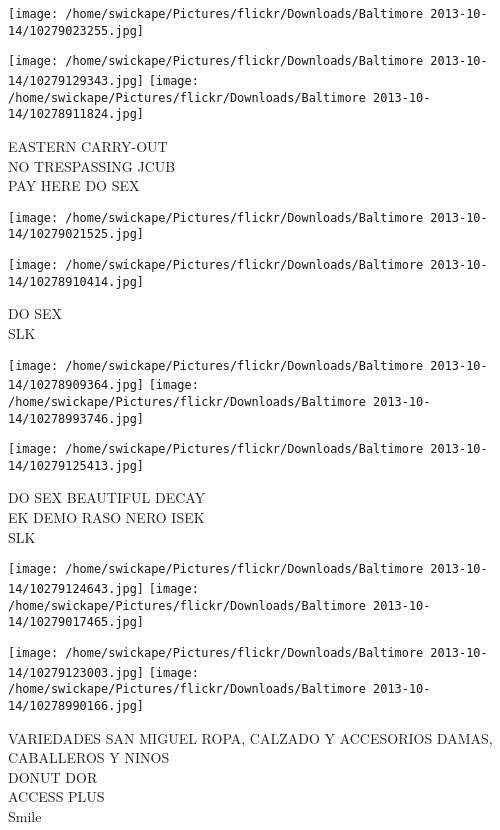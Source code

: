\documentclass[10pt,letterpaper]{article}
\begin{document}
\texttt{[image: /home/swickape/Pictures/flickr/Downloads/Baltimore 2013-10-14/10279023255.jpg]}

\vspace{0.25in}
\texttt{[image: /home/swickape/Pictures/flickr/Downloads/Baltimore 2013-10-14/10279129343.jpg]}
\texttt{[image: /home/swickape/Pictures/flickr/Downloads/Baltimore 2013-10-14/10278911824.jpg]}

EASTERN CARRY{-}OUT\\
NO TRESPASSING JCUB\\
PAY HERE DO SEX
\pagebreak

\texttt{[image: /home/swickape/Pictures/flickr/Downloads/Baltimore 2013-10-14/10279021525.jpg]}

\vspace{0.25in}
\texttt{[image: /home/swickape/Pictures/flickr/Downloads/Baltimore 2013-10-14/10278910414.jpg]}

DO SEX\\
SLK
\pagebreak

\texttt{[image: /home/swickape/Pictures/flickr/Downloads/Baltimore 2013-10-14/10278909364.jpg]}
\texttt{[image: /home/swickape/Pictures/flickr/Downloads/Baltimore 2013-10-14/10278993746.jpg]}

\vspace{0.25in}
\texttt{[image: /home/swickape/Pictures/flickr/Downloads/Baltimore 2013-10-14/10279125413.jpg]}

DO SEX BEAUTIFUL DECAY\\
EK DEMO RASO NERO ISEK\\
SLK
\pagebreak

\texttt{[image: /home/swickape/Pictures/flickr/Downloads/Baltimore 2013-10-14/10279124643.jpg]}
\texttt{[image: /home/swickape/Pictures/flickr/Downloads/Baltimore 2013-10-14/10279017465.jpg]}

\texttt{[image: /home/swickape/Pictures/flickr/Downloads/Baltimore 2013-10-14/10279123003.jpg]}
\texttt{[image: /home/swickape/Pictures/flickr/Downloads/Baltimore 2013-10-14/10278990166.jpg]}

VARIEDADES SAN MIGUEL ROPA, CALZADO Y ACCESORIOS DAMAS, CABALLEROS Y NINOS\\
DONUT DOR\\
ACCESS PLUS\\
Smile
\pagebreak
\end{document}

